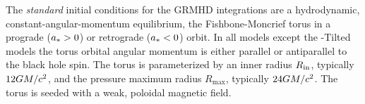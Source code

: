 The \emph{standard} initial conditions for the GRMHD integrations are a hydrodynamic, constant-angular-momentum equilibrium, the Fishbone-Moncrief torus \citep{1976ApJ...207..962F}
in a prograde ($a_* > 0$) or retrograde ($a_* < 0$) orbit.
In all models except the \hamr-Tilted models the torus orbital angular momentum is either parallel or antiparallel to the black hole spin. The torus is parameterized by an inner radius $R_{\rm in}$, typically $12GM/c^2$, and the pressure maximum radius $R_\mathrm{max}$, typically $24GM/c^2$.
The torus is seeded with a weak, poloidal magnetic field.

